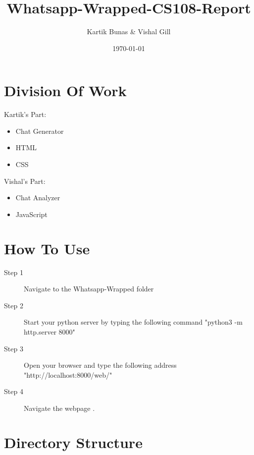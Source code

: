 \documentclass{report}
\title{Whatsapp-Wrapped-CS108-Report}
\author{Kartik Bunas \& Vishal Gill}
\date{\today}
\begin{document}
\maketitle

\section{Division Of Work}
Kartik's Part:
\begin{itemize}
    \item Chat Generator
    \item HTML
    \item CSS
\end{itemize}
Vishal's Part:
\begin{itemize}
    \item Chat Analyzer
    \item JavaScript
\end{itemize}

\section{How To Use}
\begin{description}
	\item[Step 1] Navigate to the Whatsapp-Wrapped folder
	\item[Step 2] Start your python server by typing the following command "python3 -m http.server 8000"
	\item[Step 3] Open your browser and type the following address "http://localhost:8000/web/"
	\item[Step 4] Navigate the webpage .
\end{description}

\section{Directory Structure}
\end{document}
